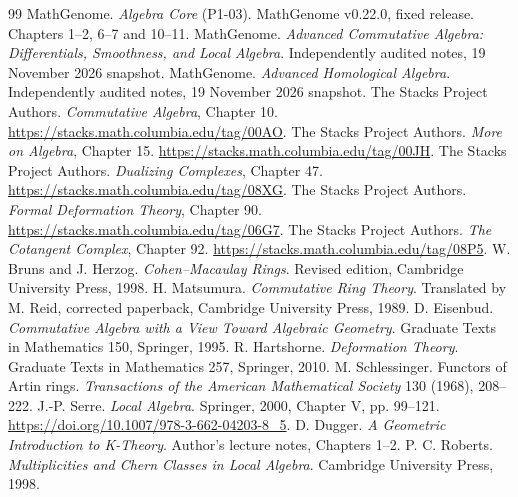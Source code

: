 \documentclass[11pt,oneside,openany]{book}
\theoremstyle{definition}
\theoremstyle{remark}
\begin{document}
\begin{thebibliography}{99}
\setlength{\itemsep}{0.2\baselineskip}
\setlength{\parsep}{0pt}
 MathGenome. \emph{Algebra Core} (P1-03). MathGenome v0.22.0,
  fixed release. Chapters 1--2, 6--7 and 10--11.
 MathGenome. \emph{Advanced Commutative Algebra:
  Differentials, Smoothness, and Local Algebra}. Independently audited
  notes, 19 November 2026 snapshot.
 MathGenome. \emph{Advanced Homological Algebra}.
  Independently audited notes, 19 November 2026 snapshot.
 The Stacks Project Authors. \emph{Commutative Algebra},
  Chapter 10. \url{https://stacks.math.columbia.edu/tag/00AO}.
 The Stacks Project Authors. \emph{More on Algebra},
  Chapter 15. \url{https://stacks.math.columbia.edu/tag/00JH}.
 The Stacks Project Authors. \emph{Dualizing Complexes},
  Chapter 47. \url{https://stacks.math.columbia.edu/tag/08XG}.
 The Stacks Project Authors. \emph{Formal Deformation Theory},
  Chapter 90. \url{https://stacks.math.columbia.edu/tag/06G7}.
 The Stacks Project Authors. \emph{The Cotangent Complex},
  Chapter 92. \url{https://stacks.math.columbia.edu/tag/08P5}.
 W. Bruns and J. Herzog. \emph{Cohen--Macaulay Rings}.
  Revised edition, Cambridge University Press, 1998.
 H. Matsumura. \emph{Commutative Ring Theory}.
  Translated by M. Reid, corrected paperback, Cambridge University Press, 1989.
 D. Eisenbud. \emph{Commutative Algebra with a View Toward Algebraic Geometry}.
  Graduate Texts in Mathematics 150, Springer, 1995.
 R. Hartshorne. \emph{Deformation Theory}.
  Graduate Texts in Mathematics 257, Springer, 2010.
 M. Schlessinger. Functors of Artin rings.
  \emph{Transactions of the American Mathematical Society} 130 (1968), 208--222.
 J.-P. Serre. \emph{Local Algebra}. Springer, 2000,
  Chapter V, pp. 99--121. \url{https://doi.org/10.1007/978-3-662-04203-8_5}.
 D. Dugger. \emph{A Geometric Introduction to K-Theory}.
  Author's lecture notes, Chapters 1--2.
 P. C. Roberts. \emph{Multiplicities and Chern Classes in
  Local Algebra}. Cambridge University Press, 1998.
\end{thebibliography}
\endgroup
\end{document}
